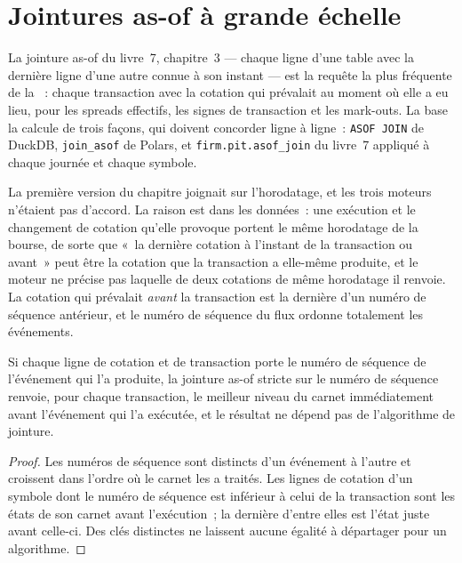 \section{Jointures as-of à grande échelle}

La jointure as-of du livre~7, chapitre~3 --- chaque ligne d'une table avec la dernière ligne d'une autre connue à son instant --- est
la requête la plus fréquente de la ~: chaque transaction avec la cotation qui prévalait au moment où elle a eu lieu, pour les spreads
effectifs, les signes de transaction et les mark-outs. La base la calcule de trois façons, qui doivent concorder ligne à ligne~: \texttt{ASOF JOIN}
de DuckDB, \texttt{join\_asof} de Polars, et \texttt{firm.pit.asof\_join} du livre~7 appliqué à chaque journée et chaque symbole.

\label{lst:pl:a-tick-store-on-open-formats:asof}

La première version du chapitre joignait sur l'horodatage, et les trois moteurs n'étaient pas d'accord. La raison est dans les données~: une
exécution et le changement de cotation qu'elle provoque portent le même horodatage de la bourse, de sorte que «~la dernière cotation à l'instant de la
transaction ou avant~» peut être la cotation que la transaction a elle-même produite, et le moteur ne précise pas laquelle de deux cotations de même horodatage
il renvoie. La cotation qui prévalait \emph{avant} la transaction est la dernière d'un numéro de séquence antérieur, et le numéro de séquence du flux
ordonne totalement les événements.

\begin{proposition}\label{prop:pl:a-tick-store-on-open-formats:seq}
Si chaque ligne de cotation et de transaction porte le numéro de séquence de l'événement qui l'a produite, la jointure as-of stricte sur le
numéro de séquence renvoie, pour chaque transaction, le meilleur niveau du carnet immédiatement avant l'événement qui l'a exécutée, et le résultat
ne dépend pas de l'algorithme de jointure.
\end{proposition}

\begin{proof}
Les numéros de séquence sont distincts d'un événement à l'autre et croissent dans l'ordre où le carnet les a traités. Les lignes de cotation d'un symbole
dont le numéro de séquence est inférieur à celui de la transaction sont les états de son carnet avant l'exécution~; la dernière d'entre elles est l'état
juste avant celle-ci. Des clés distinctes ne laissent aucune égalité à départager pour un algorithme.
\end{proof}

